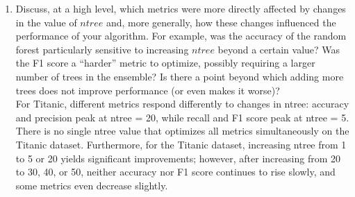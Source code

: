\documentclass{article}
\begin{document}
\begin{enumerate}
\noindent \textbf{Titanic} Hyperparameter ($k=5$, =15, \texttt{min\_samples\_split}=2)

\textbf{Titanic ntree:}
\begin{itemize}
    \item Accuracy: 20\\
because it gives the highest accuracy.
    \item Precision: 20\\
because it gives the highest precision.
    \item Recall: 5\\
because these three values achieve the same highest recall.
    \item F1: 5\\
because it gives the highest f1.
\end{itemize}

\newpage
    \item Discuss, at a high level, which metrics were more directly affected by changes in the value of $ntree$ and, more generally, how these changes influenced the performance of your algorithm. For example, was the accuracy of the random forest particularly sensitive to increasing $ntree$ beyond a certain value? Was the F1 score a ``harder'' metric to optimize, possibly requiring a larger number of trees in the ensemble? Is there a point beyond which adding more trees does not improve performance (or even makes it worse)?\\

For Titanic, different metrics respond differently to changes in ntree: accuracy and precision peak at ntree = 20, while recall and F1 score peak at ntree = 5. There is no single ntree value that optimizes all metrics simultaneously on the Titanic dataset. Furthermore, for the Titanic dataset, increasing ntree from 1 to 5 or 20 yields significant improvements; however, after increasing from 20 to 30, 40, or 50, neither accuracy nor F1 score continues to rise slowly, and some metrics even decrease slightly.

\end{enumerate}
\end{document}
